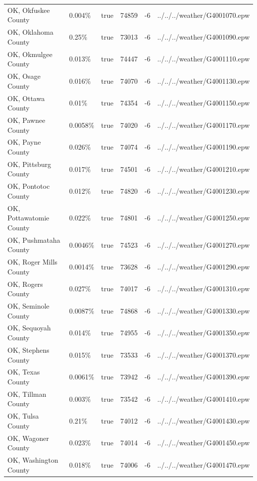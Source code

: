 \begin{longtable}[]{@{}llllll@{}}
OK, Okfuskee County & 0.004\% & true & 74859 & -6 &
../../../weather/G4001070.epw \\
OK, Oklahoma County & 0.25\% & true & 73013 & -6 &
../../../weather/G4001090.epw \\
OK, Okmulgee County & 0.013\% & true & 74447 & -6 &
../../../weather/G4001110.epw \\
OK, Osage County & 0.016\% & true & 74070 & -6 &
../../../weather/G4001130.epw \\
OK, Ottawa County & 0.01\% & true & 74354 & -6 &
../../../weather/G4001150.epw \\
OK, Pawnee County & 0.0058\% & true & 74020 & -6 &
../../../weather/G4001170.epw \\
OK, Payne County & 0.026\% & true & 74074 & -6 &
../../../weather/G4001190.epw \\
OK, Pittsburg County & 0.017\% & true & 74501 & -6 &
../../../weather/G4001210.epw \\
OK, Pontotoc County & 0.012\% & true & 74820 & -6 &
../../../weather/G4001230.epw \\
OK, Pottawatomie County & 0.022\% & true & 74801 & -6 &
../../../weather/G4001250.epw \\
OK, Pushmataha County & 0.0046\% & true & 74523 & -6 &
../../../weather/G4001270.epw \\
OK, Roger Mills County & 0.0014\% & true & 73628 & -6 &
../../../weather/G4001290.epw \\
OK, Rogers County & 0.027\% & true & 74017 & -6 &
../../../weather/G4001310.epw \\
OK, Seminole County & 0.0087\% & true & 74868 & -6 &
../../../weather/G4001330.epw \\
OK, Sequoyah County & 0.014\% & true & 74955 & -6 &
../../../weather/G4001350.epw \\
OK, Stephens County & 0.015\% & true & 73533 & -6 &
../../../weather/G4001370.epw \\
OK, Texas County & 0.0061\% & true & 73942 & -6 &
../../../weather/G4001390.epw \\
OK, Tillman County & 0.003\% & true & 73542 & -6 &
../../../weather/G4001410.epw \\
OK, Tulsa County & 0.21\% & true & 74012 & -6 &
../../../weather/G4001430.epw \\
OK, Wagoner County & 0.023\% & true & 74014 & -6 &
../../../weather/G4001450.epw \\
OK, Washington County & 0.018\% & true & 74006 & -6 &
../../../weather/G4001470.epw \\

\end{longtable}

